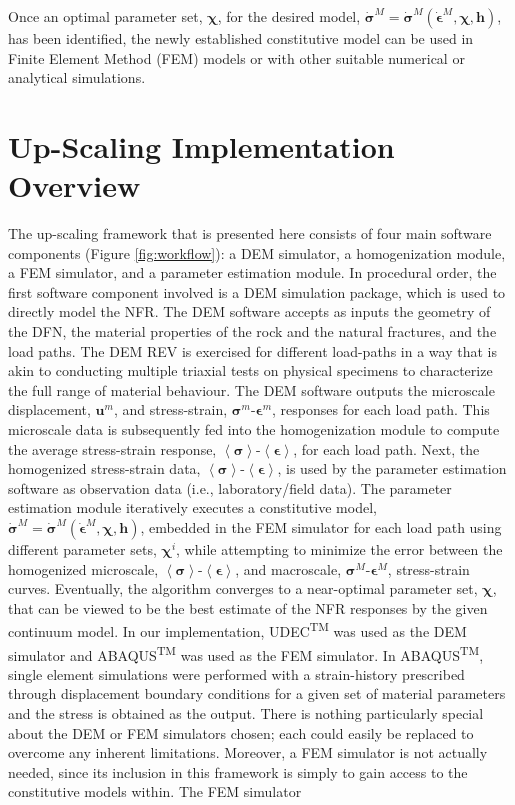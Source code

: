 Once an optimal parameter set, $\boldsymbol{\chi}$, for the desired model, $\dot{\boldsymbol{\sigma}}^M=\dot{\boldsymbol{\sigma}}^M\left(\dot{\boldsymbol{\epsilon}}^M, \boldsymbol{\chi},\mathbf{h}\right)$, has been identified, the newly established constitutive model can be used in Finite Element Method (FEM) models or with other suitable numerical or analytical simulations.

\section{Up-Scaling Implementation Overview}
The up-scaling framework that is presented here consists of four main software components (Figure \ref{fig:workflow}): a DEM simulator, a homogenization module, a FEM simulator, and a parameter estimation module. In procedural order, the first software component involved is a DEM simulation package, which is used to directly model the NFR. The DEM software accepts as inputs the geometry of the DFN, the material properties of the rock and the natural fractures, and the load paths. The DEM REV is exercised for different load-paths in a way that is akin to conducting multiple triaxial tests on physical specimens to characterize the full range of material behaviour. The DEM software outputs the microscale displacement, $\mathbf{u}^m$, and stress-strain, $\boldsymbol{\sigma}^m$-$\boldsymbol{\epsilon}^m$, responses for each load path.  This microscale data is subsequently fed into the homogenization module to compute the average stress-strain response, $\left<\boldsymbol{\sigma}\right>$-$\left<\boldsymbol{\epsilon}\right>$,  for each load path. Next, the homogenized stress-strain data, $\left<\boldsymbol{\sigma}\right>$-$\left<\boldsymbol{\epsilon}\right>$, is used by the parameter estimation software as observation data (i.e., laboratory/field data). The parameter estimation module iteratively executes a constitutive model, $\dot{\boldsymbol{\sigma}}^M=\dot{\boldsymbol{\sigma}}^M\left(\dot{\boldsymbol{\epsilon}}^M, \boldsymbol{\chi},\mathbf{h}\right)$, embedded in the FEM simulator for each load path using different parameter sets, $\boldsymbol{\chi}^i$, while attempting to minimize the error between the homogenized microscale, $\left<\boldsymbol{\sigma}\right>$-$\left<\boldsymbol{\epsilon}\right>$, and macroscale, $\boldsymbol{\sigma}^M$-$\boldsymbol{\epsilon}^M$,  stress-strain curves. Eventually, the algorithm converges to a near-optimal parameter set, $\boldsymbol{\chi}$, that can be viewed to be the best estimate of the NFR responses by the given continuum model. In our implementation, UDEC\textsuperscript{TM} was used as the DEM simulator and ABAQUS\textsuperscript{TM} was used as the FEM simulator. In ABAQUS\textsuperscript{TM}, single element simulations were performed with a strain-history prescribed through displacement boundary conditions for a given set of material parameters and the stress is obtained as the output. There is nothing particularly special about the DEM or FEM simulators chosen; each could easily be replaced to overcome any inherent limitations.  Moreover, a FEM simulator is not actually needed, since its inclusion in this framework is simply to gain access to the constitutive models within. The FEM simulator 